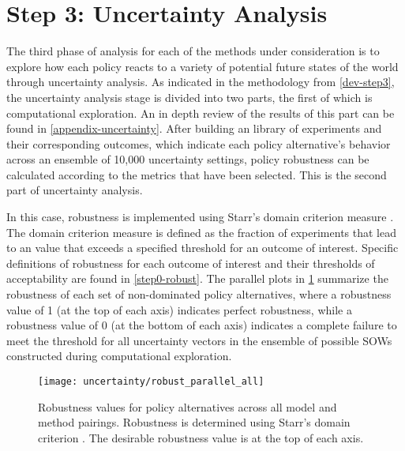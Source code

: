 \section{Step 3: Uncertainty Analysis} \label{results-step3}
The third phase of analysis for each of the methods under consideration is to explore how each policy reacts to a variety of potential future states of the world through uncertainty analysis. As indicated in the methodology from \cref{dev-step3}, the uncertainty analysis stage is divided into two parts, the first of which is computational exploration. An in depth review of the results of this part can be found in \cref{appendix-uncertainty}. After building an library of experiments and their corresponding outcomes, which indicate each policy alternative's behavior across an ensemble of 10,000 uncertainty settings, policy robustness can be calculated according to the metrics that have been selected. This is the second part of uncertainty analysis. 

In this case, robustness is implemented using Starr's domain criterion measure \citep{Starr1963}. The domain criterion measure is defined as the fraction of experiments that lead to an value that exceeds a specified threshold for an outcome of interest. Specific definitions of robustness for each outcome of interest and their thresholds of acceptability are found in \cref{step0-robust}. The parallel plots in \cref{fig:robust-parallel-all} summarize the robustness of each set of non-dominated policy alternatives, where a robustness value of 1 (at the top of each axis) indicates perfect robustness, while a robustness value of 0 (at the bottom of each axis) indicates a complete failure to meet the threshold for all uncertainty vectors in the ensemble of possible SOWs constructed during computational exploration. 

\begin{figure}[ht]
    \texttt{[image: uncertainty/robust\_parallel\_all]}
    \caption[Robustness value ranges across all pairings.]{Robustness values for policy alternatives across all model and method pairings. Robustness is determined using Starr's domain criterion \citep{Starr1963}. The desirable robustness value is at the top of each axis.}
    \label{fig:robust-parallel-all}
\end{figure}


